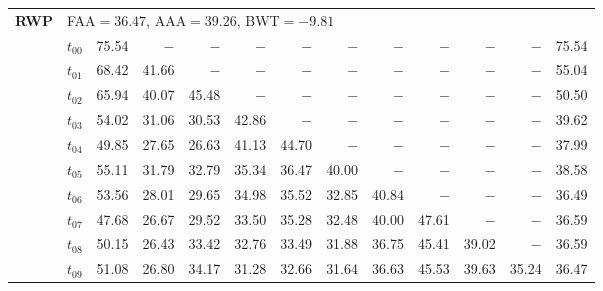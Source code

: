 \begin{table}[ht]
\begin{tabular}{@{}l l r r r r r r r r r r r@{}}
\midrule
\multirow{11}{*}{\textbf{RWP}} & \multicolumn{12}{l}{\quad\small FAA$=36.47$,\; AAA$=39.26$,\; BWT$=-9.81$} \\
 & $t_{00}$ & 75.54 & $-$ & $-$ & $-$ & $-$ & $-$ & $-$ & $-$ & $-$ & $-$ & 75.54 \\
 & $t_{01}$ & 68.42 & 41.66 & $-$ & $-$ & $-$ & $-$ & $-$ & $-$ & $-$ & $-$ & 55.04 \\
 & $t_{02}$ & 65.94 & 40.07 & 45.48 & $-$ & $-$ & $-$ & $-$ & $-$ & $-$ & $-$ & 50.50 \\
 & $t_{03}$ & 54.02 & 31.06 & 30.53 & 42.86 & $-$ & $-$ & $-$ & $-$ & $-$ & $-$ & 39.62 \\
 & $t_{04}$ & 49.85 & 27.65 & 26.63 & 41.13 & 44.70 & $-$ & $-$ & $-$ & $-$ & $-$ & 37.99 \\
 & $t_{05}$ & 55.11 & 31.79 & 32.79 & 35.34 & 36.47 & 40.00 & $-$ & $-$ & $-$ & $-$ & 38.58 \\
 & $t_{06}$ & 53.56 & 28.01 & 29.65 & 34.98 & 35.52 & 32.85 & 40.84 & $-$ & $-$ & $-$ & 36.49 \\
 & $t_{07}$ & 47.68 & 26.67 & 29.52 & 33.50 & 35.28 & 32.48 & 40.00 & 47.61 & $-$ & $-$ & 36.59 \\
 & $t_{08}$ & 50.15 & 26.43 & 33.42 & 32.76 & 33.49 & 31.88 & 36.75 & 45.41 & 39.02 & $-$ & 36.59 \\
 & $t_{09}$ & 51.08 & 26.80 & 34.17 & 31.28 & 32.66 & 31.64 & 36.63 & 45.53 & 39.63 & 35.24 & 36.47 \\
\bottomrule
\end{tabular}
\end{table}
